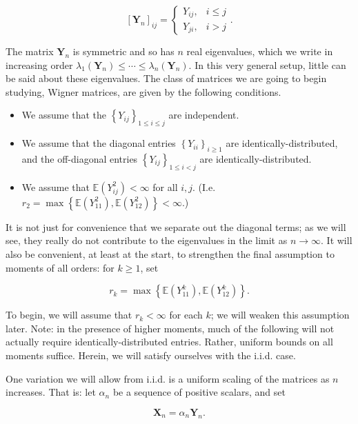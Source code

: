 \documentclass[10pt]{article}
\begin{document}
$$
\left[\mathbf{Y}_{n}\right]_{i j}=\left\{\begin{array}{ll}
Y_{i j}, & i \leq j \\
Y_{j i}, & i>j
\end{array} .\right.
$$

The matrix $\mathbf{Y}_{n}$ is symmetric and so has $n$ real eigenvalues, which we write in increasing order $\lambda_{1}\left(\mathbf{Y}_{n}\right) \leq \cdots \leq \lambda_{n}\left(\mathbf{Y}_{n}\right)$. In this very general setup, little can be said about these eigenvalues. The class of matrices we are going to begin studying, Wigner matrices, are given by the following conditions.

\begin{itemize}
  \item[-] We assume that the $\left\{Y_{i j}\right\}_{1 \leq i \leq j}$ are independent.
  \item[-] We assume that the diagonal entries $\left\{Y_{i i}\right\}_{i \geq 1}$ are identically-distributed, and the off-diagonal entries $\left\{Y_{i j}\right\}_{1 \leq i<j}$ are identically-distributed.
  \item[-] We assume that $\mathbb{E}\left(Y_{i j}^{2}\right)<\infty$ for all $i, j$. (I.e. $r_{2}=\max \left\{\mathbb{E}\left(Y_{11}^{2}\right), \mathbb{E}\left(Y_{12}^{2}\right)\right\}<\infty$.)
\end{itemize}

It is not just for convenience that we separate out the diagonal terms; as we will see, they really do not contribute to the eigenvalues in the limit as $n \rightarrow \infty$. It will also be convenient, at least at the start, to strengthen the final assumption to moments of all orders: for $k \geq 1$, set

$$
r_{k}=\max \left\{\mathbb{E}\left(Y_{11}^{k}\right), \mathbb{E}\left(Y_{12}^{k}\right)\right\} .
$$

To begin, we will assume that $r_{k}<\infty$ for each $k$; we will weaken this assumption later. Note: in the presence of higher moments, much of the following will not actually require identically-distributed entries. Rather, uniform bounds on all moments suffice. Herein, we will satisfy ourselves with the i.i.d. case.

One variation we will allow from i.i.d. is a uniform scaling of the matrices as $n$ increases. That is: let $\alpha_{n}$ be a sequence of positive scalars, and set

$$
\mathbf{X}_{n}=\alpha_{n} \mathbf{Y}_{n} .
$$
\end{document}
